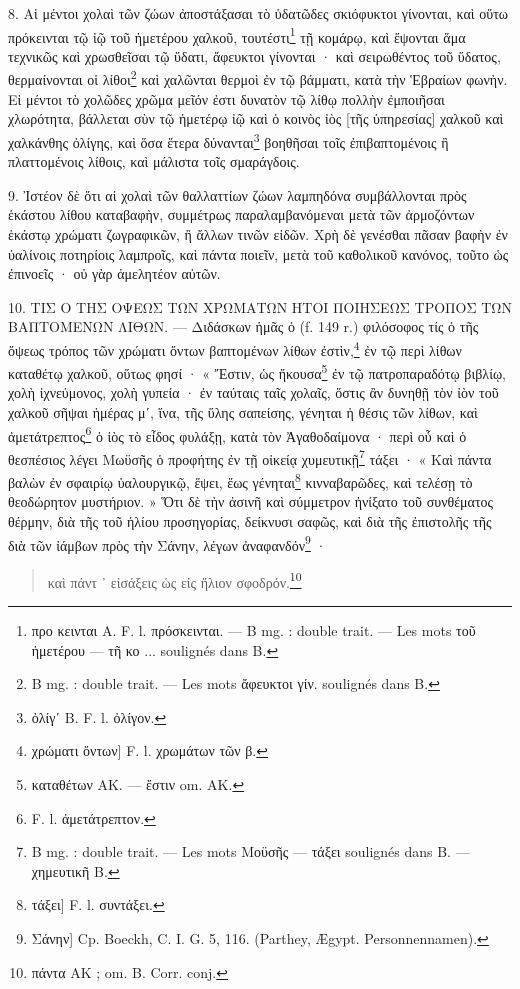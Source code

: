 \documentclass[a4paper, 11pt, oneside, polutonikogreek, french]{article}
\begin{document}
8. Αἱ μέντοι χολαὶ τῶν ζώων ἀποστάξασαι τὸ ὑδατῶδες σκιόφυκτοι γίνονται, καὶ οὕτω πρόκεινται τῷ ἰῷ τοῦ ἡμετέρου χαλκοῦ, τουτέστι\footnote{προ κεινται A. F. l. πρόσκεινται. --- B mg. : double trait. --- Les mots τοῦ ἡμετέρου --- τῆ κο ... soulignés dans B.} τῇ κομάρῳ, καὶ ἕψονται ἅμα τεχνικῶς καὶ χρωσθεῖσαι τῷ ὕδατι, ἄφευκτοι γίνονται · καὶ σειρωθέντος τοῦ ὕδατος, θερμαίνονται οἱ λίθοι\footnote{B mg. : double trait. --- Les mots ἄφευκτοι γίν. soulignés dans B.} καὶ χαλῶνται θερμοὶ ἐν τῷ βάμματι, κατὰ τὴν Ἑβραίων φωνὴν. Εἰ μέντοι τὸ χολῶδες χρῶμα μεῖόν ἐστι δυνατὸν τῷ λίθῳ πολλὴν ἐμποιῆσαι χλωρότητα, βάλλεται σὺν τῷ ἡμετέρῳ ἰῷ καὶ ὁ κοινὸς ἰὸς [τῆς ὑπηρεσίας] χαλκοῦ καὶ χαλκάνθης ὀλίγης, καὶ ὅσα ἕτερα δύνανται\footnote{ὀλίγʹ B. F. l. ὀλίγον.} βοηθῆσαι τοῖς ἐπιβαπτομένοις ἢ πλαττομένοις λίθοις, καὶ μάλιστα τοῖς σμαράγδοις.

9. Ἰστέον δὲ ὅτι αἰ χολαὶ τῶν θαλλαττίων ζώων λαμπηδόνα συμβάλλονται πρὸς ἑκάστου λίθου καταβαφὴν, συμμέτρως παραλαμβανόμεναι μετὰ τῶν ἀρμοζόντων ἑκάστῳ χρώματι ζωγραφικῶν, ἢ ἄλλων τινῶν εἰδῶν. Χρὴ δὲ γενέσθαι πᾶσαν βαφὴν ἐν ὑαλίνοις ποτηρίοις λαμπροῖς, καὶ πάντα ποιεῖν, μετὰ τοῦ καθολικοῦ κανόνος, τοῦτο ὡς ἐπινοεῖς · οὐ γὰρ ἀμελητέον αὐτῶν.

10. ΤΙΣ Ο ΤΗΣ ΟΨΕΩΣ ΤΩΝ ΧΡΩΜΑΤΩΝ ΗΤΟΙ ΠΟΙΗΣΕΩΣ ΤΡΟΠΟΣ ΤΩΝ ΒΑΠΤΟΜΕΝΩΝ ΛΙΘΩΝ. --- Διδάσκων ἡμᾶς ὁ (f. 149 r.) φιλόσοφος τίς ὁ τῆς ὄψεως τρόπος τῶν χρώματι ὄντων βαπτομένων λίθων ἐστὶν,\footnote{χρώματι ὄντων] F. l. χρωμάτων τῶν β.} ἐν τῷ περὶ λίθων καταθέτῳ χαλκοῦ, οὕτως φησί · « Ἔστιν, ὡς ἤκουσα\footnote{καταθέτων AK. --- ἔστιν om. AK.} ἐν τῷ πατροπαραδότῳ βιβλίῳ, χολὴ ἰχνεύμονος, χολὴ γυπεία · ἐν ταύταις ταῖς χολαῖς, ὅστις ἂν δυνηθῇ τὸν ἰὸν τοῦ χαλκοῦ σῆψαι ἡμέρας μʹ, ἵνα, τῆς ὕλης σαπείσης, γένηται ἡ θέσις τῶν λίθων, καὶ ἀμετάτρεπτος\footnote{F. l. ἀμετάτρεπτον.} ὁ ἰὸς τὸ εἶδος φυλάξῃ, κατὰ τὸν Ἀγαθοδαίμονα · περὶ οὗ καὶ ὁ θεσπέσιος λέγει Μωϋσῆς ὁ προφήτης ἐν τῇ οἰκείᾳ χυμευτικῇ\footnote{B mg. : double trait. --- Les mots Μοϋσῆς --- τάξει soulignés dans B. --- χημευτικῆ B.} τάξει · « Καὶ πάντα βαλὼν ἐν σφαιρίῳ ὑαλουργικῷ, ἕψει, ἕως γένηται\footnote{τάξει] F. l. συντάξει.} κινναβαρῶδες, καὶ τελέσῃ τὸ θεοδώρητον μυστήριον. » Ὅτι δὲ τὴν ἀσινῆ καὶ σύμμετρον ἠνίξατο τοῦ συνθέματος θέρμην, διὰ τῆς τοῦ ἡλίου προσηγορίας, δείκνυσι σαφῶς, καὶ διὰ τῆς ἐπιστολῆς τῆς διὰ τῶν ἰάμβων πρὸς τὴν Σάνην, λέγων ἀναφανδόν\footnote{Σάνην] Cp. Boeckh, C. I. G. 5, 116. (Parthey, Ægypt. Personnennamen).} ·
\begin{quotation}
καὶ πάντ ᾽ εἰσάξεις ὡς εἰς ἥλιον σφοδρόν.\footnote{πάντα AK ; om. B. Corr. conj.}
\end{quotation}
\end{document}
